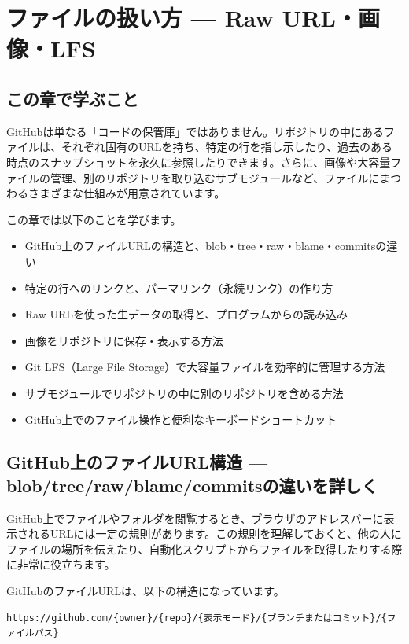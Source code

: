 \chapter{ファイルの扱い方 --- Raw URL・画像・LFS}

\section{この章で学ぶこと}

GitHubは単なる「コードの保管庫」ではありません。リポジトリの中にあるファイルは、それぞれ固有のURLを持ち、特定の行を指し示したり、過去のある時点のスナップショットを永久に参照したりできます。さらに、画像や大容量ファイルの管理、別のリポジトリを取り込むサブモジュールなど、ファイルにまつわるさまざまな仕組みが用意されています。

この章では以下のことを学びます。

\begin{itemize}
  \item GitHub上のファイルURLの構造と、blob・tree・raw・blame・commitsの違い
  \item 特定の行へのリンクと、パーマリンク（永続リンク）の作り方
  \item Raw URLを使った生データの取得と、プログラムからの読み込み
  \item 画像をリポジトリに保存・表示する方法
  \item Git LFS（Large File Storage）で大容量ファイルを効率的に管理する方法
  \item サブモジュールでリポジトリの中に別のリポジトリを含める方法
  \item GitHub上でのファイル操作と便利なキーボードショートカット
\end{itemize}

\section{GitHub上のファイルURL構造 --- blob/tree/raw/blame/commitsの違いを詳しく}

GitHub上でファイルやフォルダを閲覧するとき、ブラウザのアドレスバーに表示されるURLには一定の規則があります。この規則を理解しておくと、他の人にファイルの場所を伝えたり、自動化スクリプトからファイルを取得したりする際に非常に役立ちます。

GitHubのファイルURLは、以下の構造になっています。

\begin{lstlisting}[language={}]
https://github.com/{owner}/{repo}/{表示モード}/{ブランチまたはコミット}/{ファイルパス}
\end{lstlisting}

